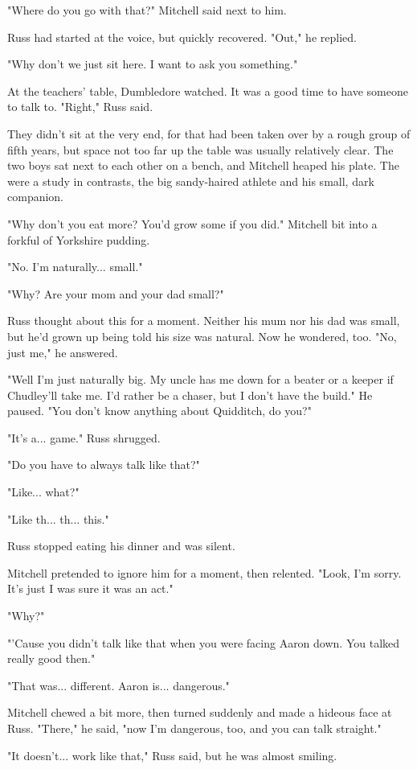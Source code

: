 \documentclass[a4paper,11pt]{article}
\begin{document}
"Where do you go with that?" Mitchell said next to him.

Russ had started at the voice, but quickly recovered. "Out," he replied.

"Why don't we just sit here. I want to ask you something."

At the teachers' table, Dumbledore watched. It was a good time to have someone to talk to. "Right," Russ said.

They didn't sit at the very end, for that had been taken over by a rough group of fifth years, but space not too far up the table was usually relatively clear. The two boys sat next to each other on a bench, and Mitchell heaped his plate. The were a study in contrasts, the big sandy-haired athlete and his small, dark companion.

"Why don't you eat more? You'd grow some if you did." Mitchell bit into a forkful of Yorkshire pudding.

"No. I'm naturally... small."

"Why? Are your mom and your dad small?"

Russ thought about this for a moment. Neither his mum nor his dad was small, but he'd grown up being told his size was natural. Now he wondered, too. "No, just me," he answered.

"Well I'm just naturally big. My uncle has me down for a beater or a keeper if Chudley'll take me. I'd rather be a chaser, but I don't have the build." He paused. "You don't know anything about Quidditch, do you?"

"It's a... game." Russ shrugged.

"Do you have to always talk like that?"

"Like... what?"

"Like th... th... this."

Russ stopped eating his dinner and was silent.

Mitchell pretended to ignore him for a moment, then relented. "Look, I'm sorry. It's just I was sure it was an act."

"Why?"

"'Cause you didn't talk like that when you were facing Aaron down. You talked really good then."

"That was... different. Aaron is... dangerous."

Mitchell chewed a bit more, then turned suddenly and made a hideous face at Russ. "There," he said, "now I'm dangerous, too, and you can talk straight."

"It doesn't... work like that," Russ said, but he was almost smiling.
\end{document}
